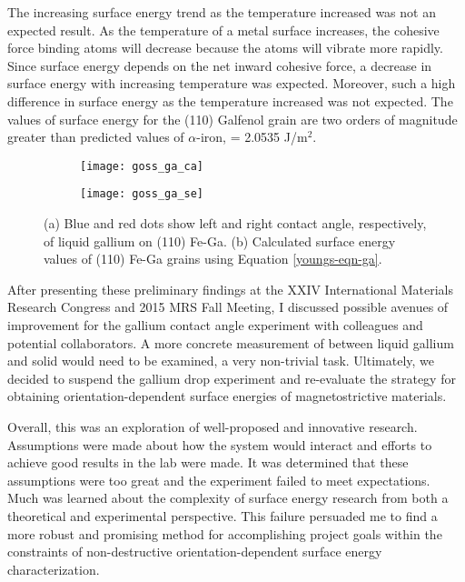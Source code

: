 The increasing surface energy trend as the temperature increased was not an expected result. As the temperature of a metal surface increases, the cohesive force binding atoms will decrease because the atoms will vibrate more rapidly. Since surface energy depends on the net inward cohesive force, a decrease in surface energy with increasing temperature was expected. Moreover, such a high difference in surface energy as the temperature increased was not expected. The values of surface energy for the \hkl(110) Galfenol grain are two orders of magnitude greater than predicted values of $\alpha$-iron, \gamSV = 2.0535 J/m$^2$.\cite{Wang2000} 
\begin{figure}[h]
	\centering
	\begin{subfigure}[c]{0.47\textwidth}
		\texttt{[image: goss\_ga\_ca]}
		\subcaption{~}
		\label{fig:goss_ga_ca}		
	\end{subfigure}
	\begin{subfigure}[c]{0.47\textwidth} 
		\texttt{[image: goss\_ga\_se]}
		\subcaption{~}
		\label{fig:goss_ga_se}		
	\end{subfigure}
	\caption{(a) Blue and red dots show left and right contact angle, respectively, of liquid gallium on \hkl(110) Fe-Ga. (b) Calculated surface energy values of \hkl(110) Fe-Ga grains using Equation \ref{youngs-eqn-ga}.}
	\label{fig:goss_se_msrmnt}
\end{figure}
 After presenting these preliminary findings at the XXIV International Materials Research Congress and 2015 MRS Fall Meeting,\cite{VanOrder2015a,VanOrder2015} I discussed possible avenues of improvement for the gallium contact angle experiment with colleagues and potential collaborators. A more concrete measurement of \gamSL between liquid gallium and solid would need to be examined, a very non-trivial task. Ultimately, we decided to suspend the gallium drop experiment and re-evaluate the strategy for obtaining orientation-dependent surface energies of magnetostrictive materials. 
 
Overall, this was an exploration of well-proposed and innovative research. Assumptions were made about how the system would interact and efforts to achieve good results in the lab were made. It was determined that these assumptions were too great and the experiment failed to meet expectations. Much was learned about the complexity of surface energy research from both a theoretical and experimental perspective. This failure persuaded me to find a more robust and promising method for accomplishing project goals within the constraints of non-destructive orientation-dependent surface energy characterization. 


